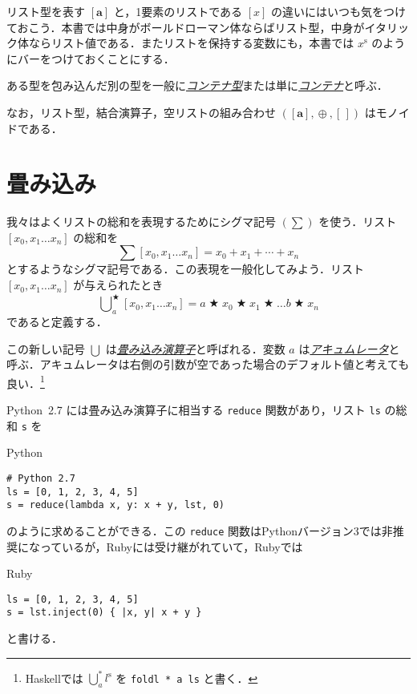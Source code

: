 \documentclass[a4paper,draft]{jsbook}
\newcommand{\programminglanguage}[1]{\textsf{#1}}
\newcommand{\haskell}{\programminglanguage{Haskell}}
\newcommand{\python}{\programminglanguage{Python}}
\newcommand{\ruby}{\programminglanguage{Ruby}}
\newcommand{\keyword}[1]{{\underline{\emph{#1}}}}
\newcommand{\code}[1]{\texttt{#1}}
\newenvironment{pythoncode}{\begin{itembox}[r]{\python}}{\end{itembox}}
\newenvironment{rubycode}{\begin{itembox}[r]{\ruby}}{\end{itembox}}
\newcommand{\mType}[1]{\mathbf{#1}}
\newcommand{\mListType}[1]{[\mType{#1}]}
\newcommand{\mEmptyList}{{[\,]}}
\newcommand{\mListWith}[1]{\left[#1\right]}
\newcommand{\mTupleWith}[1]{\left(#1\right)}
\newcommand{\mList}[1]{{#1}^\mathrm{s}}
\DeclareMathOperator{\mBinOp}{\bigstar}
\DeclareMathOperator*{\mFoldLeft}{\bigcup}
\DeclareMathOperator{\mAppend}{\oplus}
\begin{document}
リスト型を表す $\mListType{a}$ と，1要素のリストである $\mListWith{x}$ の違いにはいつも気をつけておこう．本書では中身がボールドローマン体ならばリスト型，中身がイタリック体ならリスト値である．またリストを保持する変数にも，本書では $\mList{x}$ のようにバーをつけておくことにする．

ある型を包み込んだ別の型を一般に\keyword{コンテナ型}または単に\keyword{コンテナ}と呼ぶ．

なお，リスト型，結合演算子，空リストの組み合わせ $\mTupleWith{\mListType{a},\mAppend,\mEmptyList}$ はモノイドである．

\section{畳み込み}

我々はよくリストの総和を表現するためにシグマ記号 $(\sum)$ を使う．リスト $\mListWith{x_0,x_1\dots x_n}$ の総和を
\begin{equation}
\sum\mListWith{x_0,x_1\dots x_n}=x_0+x_1+\dotsb+x_n
\end{equation}
とするようなシグマ記号である．この表現を一般化してみよう．リスト $\mListWith{x_0,x_1\dots x_n}$ が与えられたとき
\begin{equation}
\mFoldLeft^{\mBinOp}_{a}\mListWith{x_0,x_1\dots x_n}
=a\mBinOp x_0\mBinOp x_1\mBinOp\dots b\mBinOp x_n
\end{equation}
であると定義する．

この新しい記号 $\mFoldLeft$ は\keyword{畳み込み演算子}と呼ばれる．変数 $a$ は\keyword{アキュムレータ}と呼ぶ．アキュムレータは右側の引数が空であった場合のデフォルト値と考えても良い．\footnote{\haskell では $\mFoldLeft^{*}_a\mList{l}$ を \code{foldl * a ls} と書く．}

\python\ 2.7 には畳み込み演算子に相当する \code{reduce} 関数があり，リスト \code{ls} の総和 \code{s} を
\begin{pythoncode}
\begin{verbatim}
# Python 2.7
ls = [0, 1, 2, 3, 4, 5]
s = reduce(lambda x, y: x + y, lst, 0)
\end{verbatim}
\end{pythoncode}
のように求めることができる．この \code{reduce} 関数は\python バージョン3では非推奨になっているが，\ruby には受け継がれていて，\ruby では
\begin{rubycode}
\begin{verbatim}
ls = [0, 1, 2, 3, 4, 5]
s = lst.inject(0) { |x, y| x + y }
\end{verbatim}
\end{rubycode}
と書ける．
\end{document}
